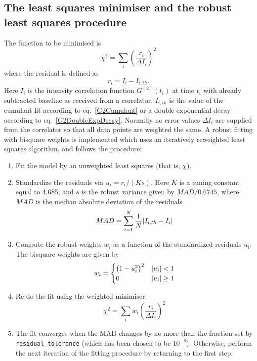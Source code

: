 \subsection{The least squares minimiser and the robust least squares
procedure}
The function to be minimised is
$$
\chi^2 = \sum_i \left( \frac{r_i}{\Delta I_i} \right)^2
$$
where the residual is defined as
$$
r_i = I_i - I_{i,th}.
$$
Here $I_i$  is the intensity correlation function $G^{(2)}(t_i)$
at time $t_i$ with already subtracted baseline as received from a correlator, $I_{i,th}$ is the value
of the cumulant fit according to eq.\ \ref{G2Cumulant} or a double exponential decay according to
eq.\ \ref{G2DoubleExpDecay}. Normally no error values
$\Delta I_i$ are supplied from the correlator so that all data points are weighted
the same. A robust fitting with bisquare weights is implemented which uses an
iteratively reweighted least squares algorithm, and follows the procedure:
\begin{enumerate}
\item Fit the model by an unweighted least
squares (that is,  $\chi$).
\item Standardize the residuals via $u_i=r_i/(Ks)$. Here $K$
is a tuning constant equal to 4.685, and $s$ is the robust variance
given by $MAD/0.6745$, where $MAD$ is the median absolute deviation of
the residuals
$$
MAD = \sum_{i=1}^N \frac{1}{N}\abs{I_{i,th}-I_i}
$$
\item Compute the robust weights $w_i$ as a function of the standardized residuals $u_i$.
The bisquare weights are given by
$$
w_i =
\begin{cases}
\left(1-u_i^2 \right)^2 & \abs{u_i} < 1 \\
0                       & \abs{u_i} \geq 1
\end{cases}
$$
\item  Re-do the fit using the weighted minimiser:
$$
\chi^2 = \sum_i w_i \left( \frac{r_i}{\Delta I_i} \right)^2
$$
\item The fit converges when the MAD changes by no more than the fraction set by
{\verb"residual_tolerance"} (which has been chosen to be $10^{-8}$). Otherwise, perform the next iteration of the
fitting procedure by returning to the first step.
\end{enumerate}


